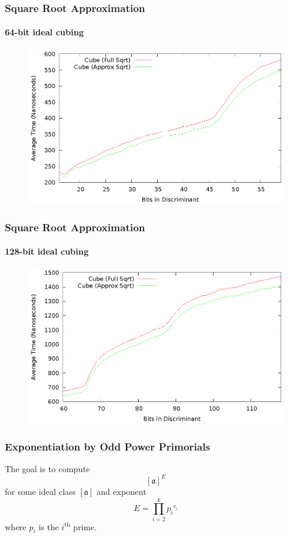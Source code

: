 \documentclass{beamer}
\newcommand{\ideal}{\mathfrak}
\newcommand{\idealclass}[1]{\left[ \ideal #1 \right]}
\newcommand{\aclass}{\idealclass a}
\newcommand{\ith}{i^{\textrm{th}}}
\begin{document}
\begin{frame}
\frametitle{Square Root Approximation}
\framesubtitle{64-bit ideal cubing}
\begin{figure}
\includegraphics[scale=0.86]{cube-sqrtopt-64}
\end{figure}
\end{frame}

\begin{frame}
\frametitle{Square Root Approximation}
\framesubtitle{128-bit ideal cubing}
\begin{figure}
\includegraphics[scale=0.86]{cube-sqrtopt-128}
\end{figure}
\end{frame}


\begin{frame}
\frametitle{Exponentiation by Odd Power Primorials}
The goal is to compute
\[
\aclass ^ E
\]
for some ideal class $\aclass$ and exponent
\[
	E = \prod_{i=2}^k {p_i}^{e_i}
\]
where $p_i$ is the $\ith$ prime.
\end{frame}
\end{document}
